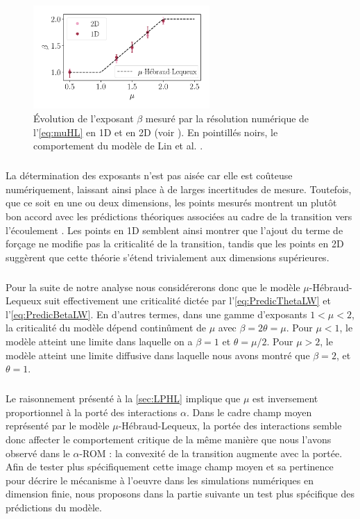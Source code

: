 \begin{figure}[h]
	\centering
	\includegraphics[width=0.6\textwidth]{Chapitre3/Figures/Interpretation/beta_alpha_LevyHL2D.pdf}
	\caption{Évolution de l'exposant $\beta$ mesuré par la résolution numérique de l'\autoref{eq:muHL} en 1D et en 2D (voir ). En pointillés noirs, le comportement du modèle de Lin et al. \cite{lin_microscopic_2018}.}
	\label{fig:LHLNum}
\end{figure}

\subparagraph{}La détermination des exposants n'est pas aisée car elle est coûteuse numériquement, laissant ainsi place à de larges incertitudes de mesure. Toutefois, que ce soit en une ou deux dimensions, les points mesurés montrent un plutôt bon accord avec les prédictions théoriques associées au cadre de la transition vers l'écoulement \cite{lin_microscopic_2018}. Les points en 1D semblent ainsi montrer que l'ajout du terme de forçage ne modifie pas la criticalité de la transition, tandis que les points en 2D suggèrent que cette théorie s'étend trivialement aux dimensions supérieures.

\subparagraph{}Pour la suite de notre analyse nous considérerons donc que le modèle $\mu$-Hébraud-Lequeux suit effectivement une criticalité dictée par l'\autoref{eq:PredicThetaLW} et l'\autoref{eq:PredicBetaLW}. En d'autres termes, dans une gamme d'exposants $1<\mu<2$, la criticalité du modèle dépend continûment de $\mu$ avec $\beta = 2\theta = \mu$. Pour $\mu < 1$, le modèle atteint une limite dans laquelle on a $\beta = 1$ et $\theta = \mu/2$. Pour $\mu>2$, le modèle atteint une limite diffusive dans laquelle nous avons montré que $\beta = 2$, et $\theta = 1$.

\subparagraph{}Le raisonnement présenté à la \autoref{sec:LPHL} implique que $\mu$ est inversement proportionnel à la porté des interactions $\alpha$. Dans le cadre champ moyen représenté par le modèle $\mu$-Hébraud-Lequeux, la portée des interactions semble donc affecter le comportement critique de la même manière que nous l'avons observé dans le $\alpha$-ROM : la convexité de la transition augmente avec la portée. Afin de tester plus spécifiquement cette image champ moyen et sa pertinence pour décrire le mécanisme à l'oeuvre dans les simulations numériques en dimension finie, nous proposons dans la partie suivante un test plus spécifique des prédictions du modèle.


